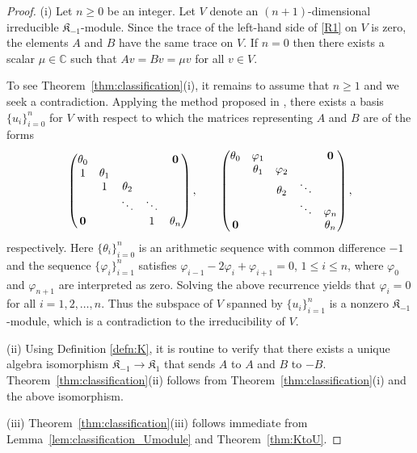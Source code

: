 \documentclass[10pt,a4paper]{amsart}
\def\C{\mathbb C}
\numberwithin{equation}{section}
\begin{document}
\begin{proof}
(i) Let $n\geq 0$ be an integer. Let $V$ denote an $(n+1)$-dimensional irreducible $\mathfrak{K}_{-1}$-module. Since the trace of the left-hand side of \eqref{R1} on $V$ is zero, the elements $A$ and $B$ have the same trace on $V$. If $n=0$ then there exists a scalar $\mu\in \C$ such that $Av=Bv=\mu v$ for all $v\in V$.

To see Theorem~\ref{thm:classification}(i), it remains to assume that $n\geq 1$ and we seek a contradiction. Applying the method proposed in \cite{Huang:2015,Huang:BImodule,SH:2019-1}, there exists a basis $\{u_i\}_{i=0}^n$ for $V$ with respect to which the matrices representing $A$ and $B$ are of the forms
\begin{gather*}\setlength{\tabcolsep}{2.0pt}%
\begin{pmatrix}
\theta_0 & & & &{\bf 0}
\\
1 &\theta_1
\\
&1 &\theta_2
 \\
& &\ddots &\ddots
 \\
{\bf 0} & & &1 &\theta_n
\end{pmatrix},
\qquad
\begin{pmatrix}
\theta_0 &\varphi_1 & & &{\bf 0}
\\
 &\theta_1 &\varphi_2
\\
 & &\theta_2 &\ddots
 \\
 & & &\ddots &\varphi_n
 \\
{\bf 0} & & & &\theta_n
\end{pmatrix},
\end{gather*}
respectively. Here $\{\theta_i\}_{i=0}^n$ is an arithmetic sequence with common difference $-1$ and the sequence $\{\varphi_i\}_{i=1}^n$ satisfies
$\varphi_{i-1}-2\varphi_i+\varphi_{i+1}=0$, $1\leq i\leq n$,
where $\varphi_0$ and $\varphi_{n+1}$ are interpreted as zero. Solving the above recurrence yields that $\varphi_i=0$ for all $i=1,2,\dots,n$. Thus the subspace of $V$ spanned by $\{u_i\}_{i=1}^n$ is a nonzero $\mathfrak{K}_{-1}$-module, which is a contradiction to the irreducibility of $V$.

(ii) Using Definition \ref{defn:K}, it is routine to verify that there exists a unique algebra isomorphism $\mathfrak K_{-1}\to \mathfrak K_1$ that sends $A$ to $A$ and $B$ to $-B$.
Theorem~\ref{thm:classification}(ii) follows from Theorem~\ref{thm:classification}(i) and the above isomorphism.

(iii) Theorem~\ref{thm:classification}(iii) follows immediate from Lemma~\ref{lem:classification_Umodule} and Theorem~\ref{thm:KtoU}.
\end{proof}
\end{document}
